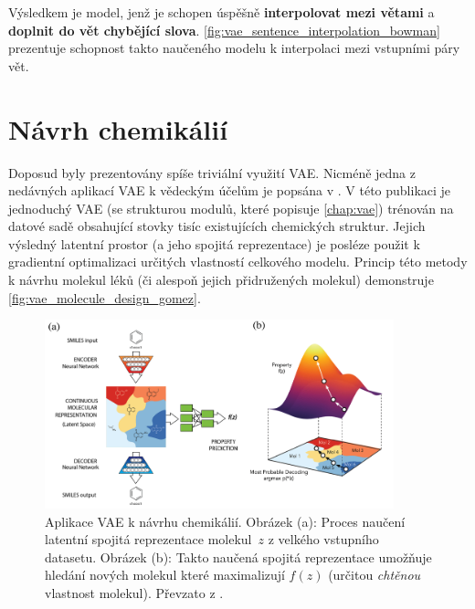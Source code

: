 Výsledkem je model, jenž je schopen úspěšně \textbf{interpolovat mezi větami} a \textbf{doplnit do vět chybějící slova}. \autoref{fig:vae_sentence_interpolation_bowman} prezentuje schopnost takto naučeného modelu k interpolaci mezi vstupními páry vět. \cite{Bowman2016}

\newpage
\section{Návrh chemikálií}
\label{sec:applications_chemical_pseudo_data_synthesis}
Doposud byly prezentovány spíše triviální využití VAE.
Nicméně jedna z nedávných aplikací VAE k vědeckým účelům je popsána v \cite{GomezBombarelli2018}.
V této publikaci je jednoduchý VAE (se strukturou modulů, které popisuje \autoref{chap:vae}) trénován na datové sadě obsahující stovky tisíc existujících chemických struktur.
Jejich výsledný latentní prostor (a jeho spojitá reprezentace) je posléze použit k gradientní optimalizaci určitých vlastností celkového modelu.
Princip této metody k návrhu molekul léků (či alespoň jejich přidružených molekul) demonstruje \autoref{fig:vae_molecule_design_gomez}. \cite{Kingma2019}

\begin{figure}[H]
    \centering
    \includegraphics[width=0.9\textwidth]{figures/applications/vae_molecule_design_gomez.png}
    \caption{Aplikace VAE k návrhu chemikálií. Obrázek (a): Proces naučení latentní spojitá reprezentace molekul $z$ z velkého vstupního datasetu. Obrázek (b): Takto naučená spojitá reprezentace umožňuje hledání nových molekul které maximalizují $f(z)$ (určitou \emph{chtěnou} vlastnost molekul). Převzato z \cite{GomezBombarelli2018}.}
    \label{fig:vae_molecule_design_gomez}
\end{figure}

\newpage
